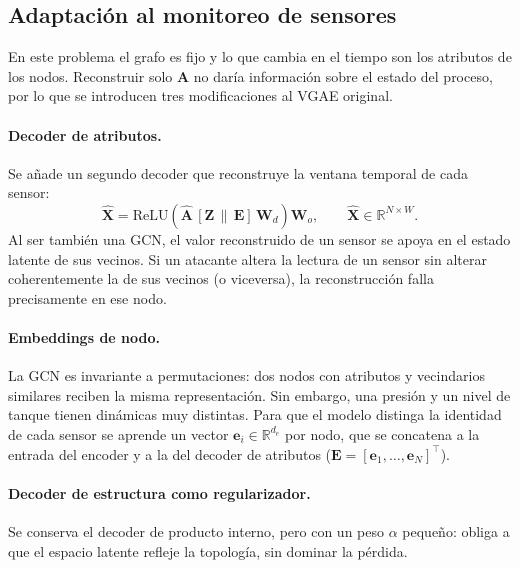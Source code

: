 \documentclass[11pt,a4paper]{article}
\newcommand{\R}{\mathbb{R}}
\newcommand{\A}{\mathbf{A}}
\newcommand{\Ahat}{\hat{\mathbf{A}}}
\newcommand{\X}{\mathbf{X}}
\newcommand{\Z}{\mathbf{Z}}
\begin{document}
\subsection{Adaptación al monitoreo de sensores}

En este problema el grafo es fijo y lo que cambia en el tiempo son los atributos de
los nodos. Reconstruir solo $\A$ no daría información sobre el estado del proceso, por
lo que se introducen tres modificaciones al VGAE original.

\paragraph{Decoder de atributos.} Se añade un segundo decoder que reconstruye la
ventana temporal de cada sensor:
\begin{equation}
\hat{\X} = \mathrm{ReLU}\!\left(\Ahat\,[\Z\,\|\,\mathbf{E}]\,\mathbf{W}_d\right)\mathbf{W}_o,
\qquad \hat{\X}\in\R^{N\times W}.
\end{equation}
Al ser también una GCN, el valor reconstruido de un sensor se apoya en el estado
latente de sus vecinos. Si un atacante altera la lectura de un sensor sin alterar
coherentemente la de sus vecinos (o viceversa), la reconstrucción falla
precisamente en ese nodo.

\paragraph{Embeddings de nodo.} La GCN es invariante a permutaciones: dos nodos con
atributos y vecindarios similares reciben la misma representación. Sin embargo, una
presión y un nivel de tanque tienen dinámicas muy distintas. Para que el modelo
distinga la identidad de cada sensor se aprende un vector $\mathbf{e}_i\in\R^{d_e}$
por nodo, que se concatena a la entrada del encoder y a la del decoder de atributos
($\mathbf{E}=[\mathbf{e}_1,\dots,\mathbf{e}_N]^\top$).

\paragraph{Decoder de estructura como regularizador.} Se conserva el decoder de
producto interno, pero con un peso $\alpha$ pequeño: obliga a que el espacio latente
refleje la topología, sin dominar la pérdida.
\end{document}
